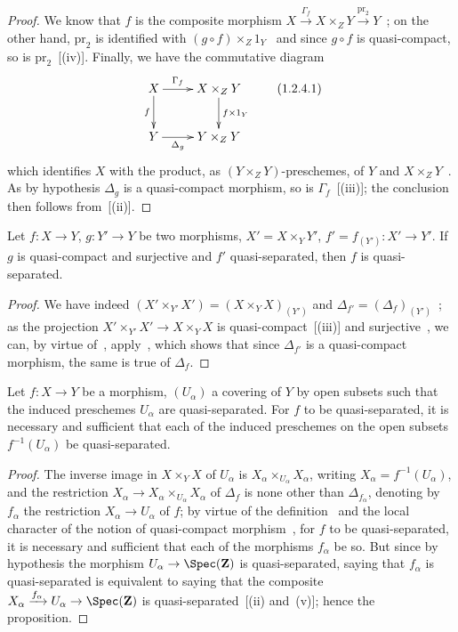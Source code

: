 \begin{proof}
We know that $f$ is the composite morphism $X\xrightarrow{\Gamma_f} X\times_Z Y\xrightarrow{\mathrm{pr}_2} Y$~; on the other hand,
$\mathrm{pr}_2$ is identified with $(g\circ f)\times_Z 1_Y$~ and since $g\circ f$ is quasi-compact, so is
$\mathrm{pr}_2$~[(iv)]. Finally, we have the commutative diagram
\[
\xymatrix{
  X \ar[r]^-{\Gamma_f} \ar[d]_-{f} & X\times_Z Y \ar[d]^-{f\times 1_Y} \\
  Y \ar[r]_-{\Delta_g} & Y\times_Z Y
}
\label{IV.1.2.4.1}
\tag{1.2.4.1}
\]
which identifies $X$ with the product, as $(Y\times_Z Y)$-preschemes, of $Y$ and
$X\times_Z Y$~. As
by hypothesis $\Delta_g$ is a quasi-compact morphism, so is $\Gamma_f$~[(iii)];
the conclusion then follows from~[(ii)].
\end{proof}

\begin{proposition}[1.2.5]
\label{IV.1.2.5}
Let $f:X\to Y$, $g:Y'\to Y$ be two morphisms, $X'=X\times_Y Y'$,
$f'=f_{(Y')}:X'\to Y'$. If $g$ is quasi-compact and surjective and $f'$ quasi-separated, then $f$ is
quasi-separated.
\end{proposition}

\begin{proof}
We have indeed $(X'\times_{Y'} X')=(X\times_Y X)_{(Y')}$ and $\Delta_{f'}=(\Delta_f)_{(Y')}$~; as the
projection $X'\times_{Y'} X'\to X\times_Y X$ is quasi-compact~[(iii)] and surjective~,
we can, by virtue of~, apply~, which shows that since $\Delta_{f'}$ is
a quasi-compact morphism, the same is true of $\Delta_f$.
\end{proof}

\begin{proposition}[1.2.6]
\label{IV.1.2.6}
Let $f:X\to Y$ be a morphism, $(U_\alpha)$ a covering of $Y$
by open subsets such that the induced preschemes $U_\alpha$ are quasi-separated. For $f$ to be quasi-separated, it is necessary and sufficient that each of the induced preschemes on the open subsets $f^{-1}(U_\alpha)$ be
quasi-separated.
\end{proposition}

\begin{proof}
The inverse image in $X\times_Y X$ of $U_\alpha$ is $X_\alpha\times_{U_\alpha} X_\alpha$, writing $X_\alpha=f^{-1}(U_\alpha)$,
and the restriction $X_\alpha\to X_\alpha\times_{U_\alpha} X_\alpha$ of $\Delta_f$ is none other than $\Delta_{f_\alpha}$, denoting by $f_\alpha$ the restriction
$X_\alpha\to U_\alpha$ of $f$; by virtue of the definition~ and the local character of the notion of
quasi-compact morphism~, for $f$ to be quasi-separated, it is necessary and sufficient that
each of the morphisms $f_\alpha$ be so. But since by hypothesis the morphism $U_\alpha\to\Spec(\mathbf{Z})$
is quasi-separated, saying that $f_\alpha$ is quasi-separated is equivalent to saying that the composite
$X_\alpha\xrightarrow{f_\alpha} U_\alpha\to\Spec(\mathbf{Z})$ is quasi-separated~[(ii) and~(v)];
hence the proposition.
\end{proof}

